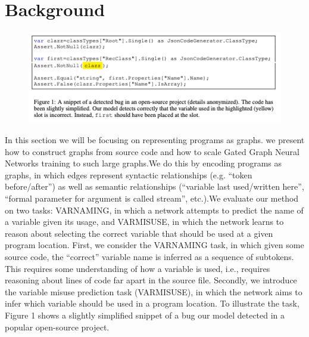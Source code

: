 \documentclass{article}
\begin{document}

\section{Background}

\begin{figure}[ht]
\vskip 0.2in
\begin{center}
\centerline{\includegraphics[width=\columnwidth]{Images/Background1.png}}
\label{icml-historical}
\end{center}
\vskip -0.2in
\end{figure}
In this section we will be focusing on representing programs as graphs. we present how to construct graphs from source code and how to scale Gated Graph Neural Networks training to such large graphs.We do this by encoding programs as graphs, in which edges represent syntactic relationships (e.g. “token before/after”) as well as semantic relationships (“variable last used/written here”, “formal parameter for argument is called stream”, etc.).We evaluate our method on two tasks: VARNAMING, in which a network attempts to predict the name of a variable given its usage, and VARMISUSE, in which the network learns to reason about selecting the correct variable that should be used at a given program location. First, we consider the VARNAMING task, in which given some source code, the “correct” variable name is inferred as a sequence of subtokens. This requires some understanding of how a variable is used, i.e., requires reasoning about lines of code far apart in the source file. Secondly, we introduce the variable misuse prediction task (VARMISUSE), in which the network aims to infer which variable should be used in a program location. To illustrate the task, Figure 1 shows a slightly simplified snippet of a bug our model detected in a popular open-source project.
\end{document}
